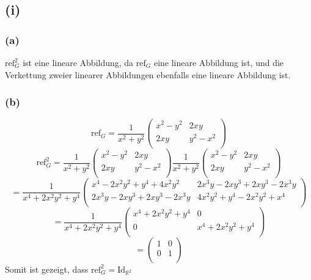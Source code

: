 \documentclass{article}
\begin{document}
\subsection{(i)}
\subsubsection{(a)}
$\text{ref}_G^2$ ist eine lineare Abbildung, da $\text{ref}_G$ eine lineare Abbildung ist, und die Verkettung zweier linearer Abbildungen ebenfalls eine lineare Abbildung ist.
\subsubsection{(b)}
\[\text{ref}_G = \frac{1}{x^2 + y^2} \left(\begin{matrix}
    x^2-y^2 & 2xy \\
    2xy & y^2-x^2 \\
\end{matrix}\right)\]
\[\text{ref}_G^2 = \frac{1}{x^2 + y^2} \left(\begin{matrix}
    x^2-y^2 & 2xy \\
    2xy & y^2-x^2 \\
\end{matrix}\right) \frac{1}{x^2+y^2} \left(\begin{matrix}
    x^2-y^2 & 2xy \\
    2xy & y^2-x^2 \\
\end{matrix}\right)\]
\[= \frac{1}{x^4 + 2x^2y^2+y^4}\left(\begin{matrix}
    x^4-2x^2y^2+y^4+4x^2y^2 & 2x^3y-2xy^3+2xy^3-2x^3y \\
    2x^3y-2xy^3+2xy^3-2x^3y & 4x^2y^2+y^4-2x^2y^2+x^4 \\
\end{matrix}\right)\]
\[= \frac{1}{x^4 + 2x^2y^2+y^4}\left(\begin{matrix}
    x^4+2x^2y^2+y^4 & 0 \\
    0 & x^4+2x^2y^2+y^4 \\
\end{matrix}\right)\]
\[= \left(\begin{matrix}
    1 & 0 \\
    0 & 1 \\
\end{matrix}\right)\]
Somit ist gezeigt, dass $\text{ref}_G^2 = \text{Id}_{\mathbb{R}^2}$
\end{document}
